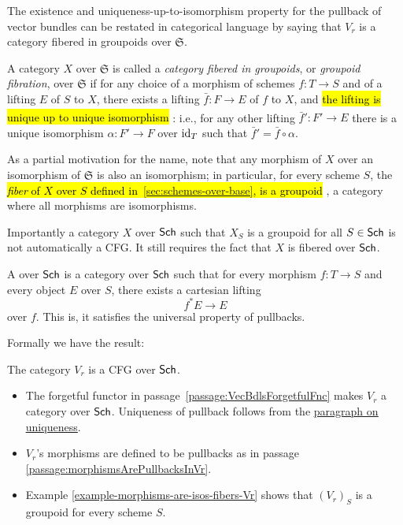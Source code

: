 \documentclass[12pt]{memoir}
\makeatletter
\newcommand{\roundedhighlight}[1]{%
  \begingroup
  \setuloverlap{2pt}%
  \def\SOUL@ulunderline##1{{%
    \setbox\z@\hbox{##1}%
    \rlap{\SOUL@ulcolor{\tikz[overlay,blend mode=darken]{%
      \fill[rounded corners=2pt]
        (-\SOUL@uloverlap,-\SOUL@uldp)
        rectangle (\dimexpr\wd\z@+\SOUL@uloverlap\relax,\SOUL@ulht);%
    }}}%
    \unhcopy\z@
  }}%
  \hl{#1}%
  \endgroup
}
\DeclareRobustCommand{\hlblue}[1]{{\sethlcolor{noteblue}\roundedhighlight{#1}}}
\DeclareRobustCommand{\hlgreen}[1]{{\sethlcolor{notegreen}\roundedhighlight{#1}}}
\newcounter{passage}
\newcommand{\passagemark}{%
  \refstepcounter{passage}%
  \textsuperscript{\normalfont[\thepassage]}%
}
\makeatother
\begin{document}
The existence and uniqueness-up-to-isomorphism property for the pullback of vector bundles can be restated in categorical language by saying that $V_r$ is a category fibered in groupoids over $\mathfrak{S}$.

\begin{Def}\label{def:3.1}
A category $X$ over $\mathfrak{S}$ is called a \emph{category fibered in groupoids}, or \emph{groupoid fibration}, over $\mathfrak{S}$ if for any choice of a morphism of schemes $f\colon T \to S$ and of a lifting $E$ of $S$ to $X$, there exists a lifting $\bar{f}\colon F \to E$ of $f$ to $X$, and \hlgreen{the lifting is unique up to unique isomorphism}\passagemark\label{passage:LiftUniqueUpToUniqueIsom}: i.e., for any other lifting $\bar{f}'\colon F' \to E$ there is a unique isomorphism $\alpha\colon F' \to F$ over $\operatorname{id}_T$ such that $\bar{f}' = \bar{f} \circ \alpha$.
\end{Def}

As a partial motivation for the name, note that any morphism of $X$ over an isomorphism of $\mathfrak{S}$ is also an isomorphism; in particular, for every scheme $S$, the \hlblue{\emph{fiber} of $X$ over $S$ defined in~\ref{sec:schemes-over-base}, is a groupoid}, a category where all morphisms are isomorphisms.

\begin{ptcb}
    \begin{nonum-Rmk}
        Importantly a category \(X\) over \(\mathsf{Sch}\) such that \(X_S\) is a groupoid for all \(S\in\mathsf{Sch}\) is not automatically a CFG. It still requires the fact that \(X\) is fibered over \(\mathsf{Sch}\).
    \end{nonum-Rmk}
    \begin{Def}
        A  over \(\mathsf{Sch}\) is a category over \(\mathsf{Sch}\) such that for every morphism \(f:T\to S\) and every object \(E\) over \(S\), there exists a cartesian lifting 
        \[
            f^\ast E\to E
        \]
        over \(f\). This is, it satisfies the universal property of pullbacks.
    \end{Def}
\end{ptcb}

\begin{ptcb}
    Formally we have the result:

    \begin{nonum-Prop}
    The category \(V_r\) is a CFG over \(\mathsf{Sch}\).
    \end{nonum-Prop}

    \begin{itemize}
        \item The forgetful functor in passage~\ref{passage:VecBdlsForgetfulFnc} makes \(V_r\) a category over \(\mathsf{Sch}\). Uniqueness of pullback follows from the \hyperref[para:vector-bundle-pullback-uniqueness]{\underline{paragraph on uniqueness}}.
        \item \(V_r\)'s morphisms are defined to be pullbacks as in passage \ref{passage:morphismsArePullbacksInVr}.
        \item Example \ref{example-morphisms-are-isos-fibers-Vr} shows that \((V_r)_S\) is a groupoid for every scheme \(S\).
    \end{itemize}
\end{ptcb}
\end{document}
